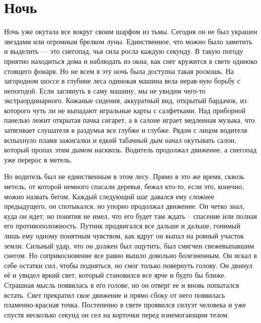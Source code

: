

\chapter{Ночь}
\lettrine{Н}{}очь уже окутала все вокруг своим шарфом из тьмы. Сегодня он не был украшен звездами или огромным брелком луны. Единственное, что можно было заметить и выделить — это снегопад, чья сила росла каждую секунду. В такую погоду приятно находиться дома и наблюдать из окна, как снег кружится в свете одиноко стоящего фонаря. Но не всем в эту ночь была доступна такая роскошь. На загородном шоссе в глубине леса одинокая машина вела нерав-ную борьбу с непогодой. Если заглянуть в саму машину, мы не увидим чего-то экстраординарного. Кожаные сидения, аккуратный вид, открытый бардачок, из которого чуть ли не выпадают игральные карты с салфетками. Над приборной панелью лежит открытая пачка сигарет, а в салоне играет медленная музыка, что затягивает слушателя в раздумья все глубже и глубже. Рядом с лицом водителя вспыхнуло пламя зажигалки и едкий табачный дым начал окутывать салон, который пропах этим дымом насквозь. Водитель продолжал движение, а снегопад уже перерос в метель.

Но водитель был не единственным в этом лесу. Прямо в это же время, сквозь метель, от которой немного спасали деревья, бежал кто-то, если это, конечно, можно назвать бегом. Каждый следующий шаг давался ему сложнее предыдущего, он спотыкался, но упорно продолжал движение. Он четко знал, куда он идет, но понятия не имел, что его будет там ждать – спасение или полная его противоположность. Путник продвигался все дальше и дальше, гонимый лишь ему одному понятным чувством, как вдруг он выпал на ровный участок земли. Сильный удар, что он должен был ощутить, был смягчен свежевыпавшим снегом. Но соприкосновение все равно вышло довольно болезненным. Он искал в себе остатки сил, чтобы подняться, но смог только повернуть голову. Он двинул её и увидел яркий свет, который становился все ярче и будто бы ближе. Страшная мысль появилась в его голове, но он отверг ее и вновь попытался встать. Свет прекратил свое движение и прямо сбоку от него появилась пламенно-красная точка. Постепенно в свете проявился силуэт человека и уже спустя несколько секунд он сел на корточки перед изнемогающим телом.

